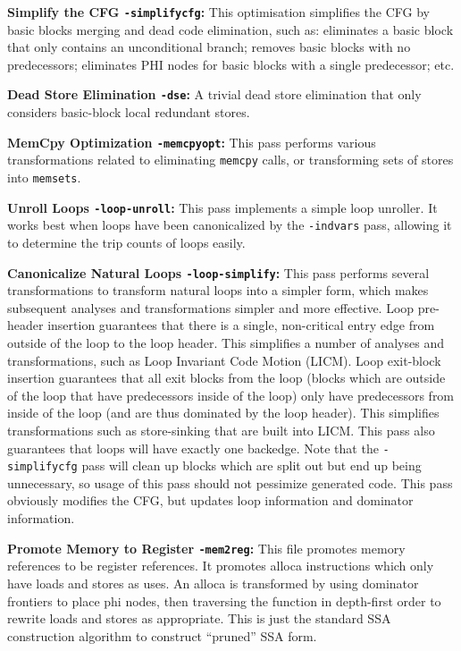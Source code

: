\noindent\textbf{Simplify the CFG \texttt{-simplifycfg}:}
This optimisation simplifies the CFG by basic blocks merging and dead code elimination, such as:
eliminates a basic block that only contains an unconditional branch;
removes basic blocks with no predecessors;
eliminates PHI nodes for basic blocks with a single predecessor; etc.

\noindent\textbf{Dead Store Elimination \texttt{-dse}:}
A trivial dead store elimination that only considers basic-block local redundant stores.

\noindent\textbf{MemCpy Optimization \texttt{-memcpyopt}:}
This pass performs various transformations related to eliminating \texttt{memcpy} calls, or transforming sets of stores into \texttt{memsets}.

\noindent\textbf{Unroll Loops \texttt{-loop-unroll}:}
This pass implements a simple loop unroller. It works best when loops have been canonicalized by the \texttt{-indvars} pass, allowing it to determine the trip counts of loops easily.

\noindent\textbf{Canonicalize Natural Loops \texttt{-loop-simplify}:}
This pass performs several transformations to transform natural loops into a simpler form, which makes subsequent analyses and transformations simpler and more effective.
Loop pre-header insertion guarantees that there is a single, non-critical entry edge from outside of the loop to the loop header.
This simplifies a number of analyses and transformations, such as Loop Invariant Code Motion (LICM).
Loop exit-block insertion guarantees that all exit blocks from the loop (blocks which are outside of the loop that have predecessors inside of the loop) only have predecessors from inside of the loop (and are thus dominated by the loop header). This simplifies transformations such as store-sinking that are built into LICM.
This pass also guarantees that loops will have exactly one backedge.
Note that the \texttt{-simplifycfg} pass will clean up blocks which are split out but end up being unnecessary, so usage of this pass should not pessimize generated code.
This pass obviously modifies the CFG, but updates loop information and dominator information.

\noindent\textbf{Promote Memory to Register \texttt{-mem2reg}:}
This file promotes memory references to be register references. It promotes alloca instructions which only have loads and stores as uses. An alloca is transformed by using dominator frontiers to place phi nodes, then traversing the function in depth-first order to rewrite loads and stores as appropriate. This is just the standard SSA construction algorithm to construct “pruned” SSA form.

